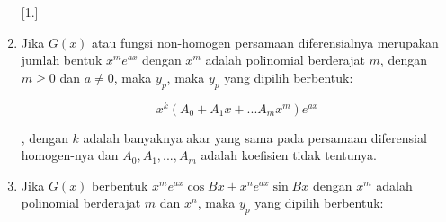 \begin{enumerate} [1.]

	\item Jika \begin{math} G(x) \end{math} atau fungsi non-homogen persamaan diferensialnya merupakan jumlah bentuk \begin{math} x^{m} e^{ax} \end{math} dengan \begin{math} x^{m} \end{math} adalah polinomial berderajat \begin{math} m \end{math}, dengan \begin{math} m \geq 0 \end{math} dan \begin{math} a \neq 0 \end{math}, maka \begin{math} y_p \end{math}, maka \begin{math} y_p \end{math} yang dipilih berbentuk:

	\begin{equation} x^{k} (A_0 + A_1 x + ... A_m x^{m}) e^{ax} \end{equation}

 	, dengan \begin{math} k \end{math} adalah banyaknya akar yang sama pada persamaan diferensial homogen-nya dan \begin{math} A_0, A_1, ..., A_m \end{math} adalah koefisien tidak tentunya.

	\item Jika \begin{math} G(x) \end{math} berbentuk \begin{math} x^{m} e^{ax} \cos Bx + x^{n} e^{ax} \sin Bx \end{math} dengan \begin{math} x^{m} \end{math} adalah polinomial berderajat \begin{math} m \end{math} dan \begin{math} x^{n} \end{math}, maka \begin{math} y_p \end{math} yang dipilih berbentuk:


\end{enumerate}
